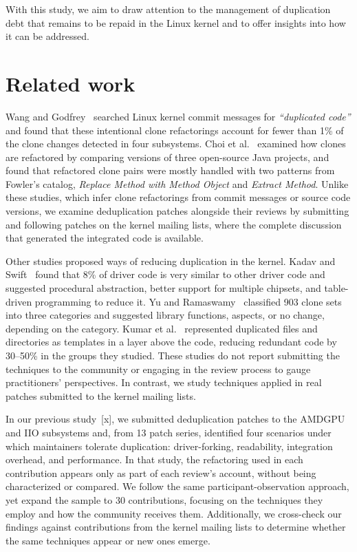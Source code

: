 \documentclass[10pt,conference]{IEEEtran}
\begin{document}
With this study, we aim to draw attention to the management of duplication debt that remains to be repaid in the Linux kernel and to offer insights into how it can be addressed.


\section{Related work}\label{sec:related_work}

Wang and Godfrey~\cite{wang2014intentional} searched Linux kernel commit messages for \textit{``duplicated code''} and found that these intentional clone refactorings account for fewer than 1\% of the clone changes detected in four subsystems. Choi et al.~\cite{choi2012clones} examined how clones are refactored by comparing versions of three open-source Java projects, and found that refactored clone pairs were mostly handled with two patterns from Fowler's catalog, \textit{Replace Method with Method Object} and \textit{Extract Method}. Unlike these studies, which infer clone refactorings from commit messages or source code versions, we examine deduplication patches alongside their reviews by submitting and following patches on the kernel mailing lists, where the complete discussion that generated the integrated code is available.

Other studies proposed ways of reducing duplication in the kernel.
Kadav and Swift~\cite{kadav2012drivers} found that 8\% of driver code is very similar to other driver code and suggested procedural abstraction, better support for multiple chipsets, and table-driven programming to reduce it. Yu and Ramaswamy~\cite{yu2008modularity} classified 903 clone sets into three categories and suggested library functions, aspects, or no change, depending on the category. Kumar et al.~\cite{kumar2016bigclones} represented duplicated files and directories as templates in a layer above the code, reducing redundant code by 30--50\% in the groups they studied. These studies do not report submitting the techniques to the community or engaging in the review process to gauge practitioners' perspectives. In contrast, we study techniques applied in real patches submitted to the kernel mailing lists.

In our previous study~[x], we submitted deduplication patches to the AMDGPU and IIO subsystems and, from 13 patch series, identified four scenarios under which maintainers tolerate duplication: driver-forking, readability, integration overhead, and performance. In that study, the refactoring used in each contribution appears only as part of each review's account, without being characterized or compared. We follow the same participant-observation approach, yet expand the sample to 30 contributions, focusing on the techniques they employ and how the community receives them. Additionally, we cross-check our findings against contributions from the kernel mailing lists to determine whether the same techniques appear or new ones emerge.
\end{document}
